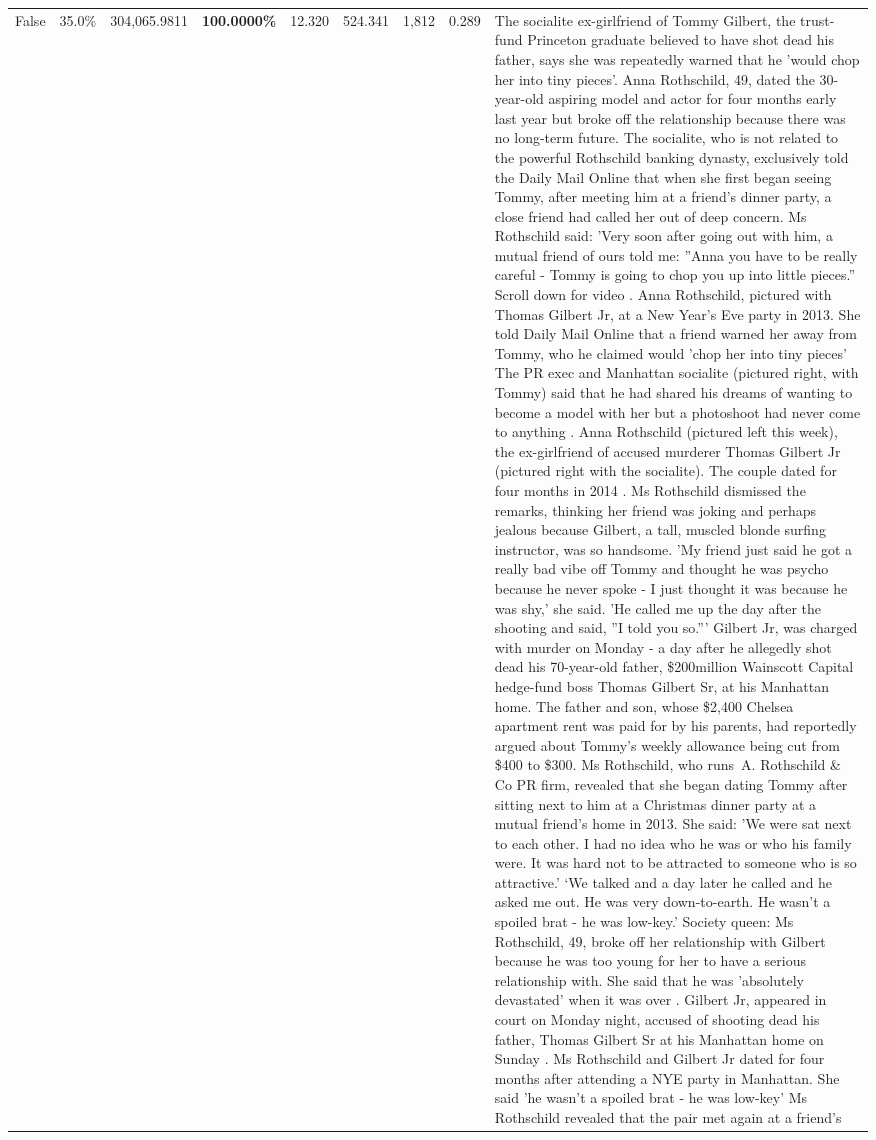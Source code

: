 \begin{table}[H]
\begin{tabular}{lllrlllll}
False & 35.0\% & \color{red} 304,065.9811 & \bfseries \color{red} 100.0000\% & 12.320 & 524.341 & 1,812 & 0.289 & The socialite ex-girlfriend of Tommy Gilbert, the trust-fund Princeton graduate believed to have shot dead his father, says she was repeatedly warned that he 'would chop her into tiny pieces'. Anna Rothschild, 49, dated the 30-year-old aspiring model and actor for four months early last year but broke off the relationship because there was no long-term future. The socialite, who is not related to the powerful Rothschild banking dynasty, exclusively told the Daily Mail Online that when she first began seeing Tommy, after meeting him at a friend's dinner party, a close friend had called her out of deep concern. Ms Rothschild said: 'Very soon after going out with him, a mutual friend of ours told me: ''Anna you have to be really careful - Tommy is going to chop you up into little pieces.'' Scroll down for video . Anna Rothschild, pictured with Thomas Gilbert Jr, at a New Year's Eve party in 2013. She told Daily Mail Online that a friend warned her away from Tommy, who he claimed would 'chop her into tiny pieces' The PR exec and Manhattan socialite (pictured right, with Tommy) said that he had shared his dreams of wanting to become a model with her but a photoshoot had never come to anything . Anna Rothschild (pictured left this week), the ex-girlfriend of accused murderer Thomas Gilbert Jr (pictured right with the socialite). The couple dated for four months in 2014 . Ms Rothschild dismissed the remarks, thinking her friend was joking and perhaps jealous because Gilbert, a tall, muscled blonde surfing instructor, was so handsome. 'My friend just said he got a really bad vibe off Tommy and thought he was psycho because he never spoke - I just thought it was because he was shy,' she said. 'He called me up the day after the shooting and said, ''I told you so.''' Gilbert Jr, was charged with murder on Monday - a day after he allegedly shot dead his 70-year-old father, \$200million Wainscott Capital hedge-fund boss Thomas Gilbert Sr, at his Manhattan home. The father and son, whose \$2,400 Chelsea apartment rent was paid for by his parents, had reportedly argued about Tommy's weekly allowance being cut from \$400 to \$300. Ms Rothschild, who runs A. Rothschild \& Co PR firm, revealed that she began dating Tommy after sitting next to him at a Christmas dinner party at a mutual friend's home in 2013. She said: 'We were sat next to each other. I had no idea who he was or who his family were. It was hard not to be attracted to someone who is so attractive.' ‘We talked and a day later he called and he asked me out. He was very down-to-earth. He wasn’t a spoiled brat - he was low-key.’ Society queen: Ms Rothschild, 49, broke off her relationship with Gilbert because he was too young for her to have a serious relationship with. She said that he was 'absolutely devastated' when it was over . Gilbert Jr, appeared in court on Monday night, accused of shooting dead his father, Thomas Gilbert Sr at his Manhattan home on Sunday . Ms Rothschild and Gilbert Jr dated for four months after attending a NYE party in Manhattan. She said 'he wasn't a spoiled brat - he was low-key' Ms Rothschild revealed that the pair met again at a friend’s 
\end{tabular}
\end{table}
